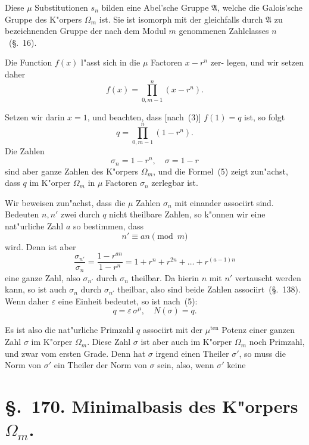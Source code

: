 \documentclass[12pt,a4paper]{article}
\theoremstyle{weber}
\begin{document}
Diese $\mu$ Substitutionen $s_n$ bilden eine Abel'sche Gruppe $\mathfrak{A}$,
welche die Galois'sche Gruppe des K"orpers $\varOmega_m$ ist. Sie ist
isomorph mit der gleichfalls durch $\mathfrak{A}$ zu bezeichnenden Gruppe
der nach dem Modul $m$ genommenen Zahlclasses $n$~(\S.~16).

Die Function $f(x)$ l"asst sich in die $\mu$ Factoren $x - r^n$ zer-
legen, und wir setzen daher
\begin{equation}\label{eq:s169-4}
f(x) = \prod_{0, m-1}^{n} (x - r^n).
\end{equation}

Setzen wir darin $x = 1$, und beachten, dass [nach~(3)]
$f(1) = q$ ist, so folgt
\begin{equation}\label{eq:s169-5}
q = \prod_{0, m-1}^{n} (1 - r^n).
\end{equation}
Die Zahlen
\begin{equation}\label{eq:s169-6}
\sigma_n = 1 - r^n, \quad \sigma = 1 - r
\end{equation}
sind aber ganze Zahlen des K"orpers $\varOmega_m$, und die Formel~(5)
zeigt zun"achst, dass $q$ im K"orper $\varOmega_m$ in $\mu$ Factoren $\sigma_n$
zerlegbar ist.

Wir beweisen zun"achst, dass die $\mu$ Zahlen $\sigma_n$ mit einander
associirt sind. Bedeuten $n, n'$ zwei durch $q$ nicht theilbare Zahlen,
so k"onnen wir eine nat"urliche Zahl $a$ so bestimmen, dass
\[
n' \equiv an \pmod{m}
\]
wird. Denn ist aber
\[
\frac{\sigma_{n'}}{\sigma_n} = \frac{1 - r^{an}}{1 - r^n} = 1 + r^n + r^{2n} + \dots + r^{(a-1)n}
\]
eine ganze Zahl, also $\sigma_{n'}$ durch $\sigma_n$ theilbar. Da hierin $n$ mit $n'$
vertauscht werden kann, so ist auch $\sigma_n$ durch $\sigma_{n'}$ theilbar, also
sind beide Zahlen associirt~(\S.~138). Wenn daher $\varepsilon$ eine Einheit
bedeutet, so ist nach~(5):
\begin{equation}\label{eq:s169-7}
q = \varepsilon\,\sigma^\mu, \quad N(\sigma) = q.
\end{equation}

Es ist also die nat"urliche Primzahl $q$ associirt mit der $\mu^{\mathrm{ten}}$
Potenz einer ganzen Zahl $\sigma$ im K"orper $\varOmega_m$. Diese Zahl $\sigma$ ist
aber auch im K"orper $\varOmega_m$ noch Primzahl, und zwar vom ersten
Grade. Denn hat $\sigma$ irgend einen Theiler $\sigma'$, so muss die Norm
von $\sigma'$ ein Theiler der Norm von $\sigma$ sein, also, wenn $\sigma'$ keine

\newpage
\section*{\S.~170. Minimalbasis des K"orpers $\varOmega_m$.}
\end{document}
